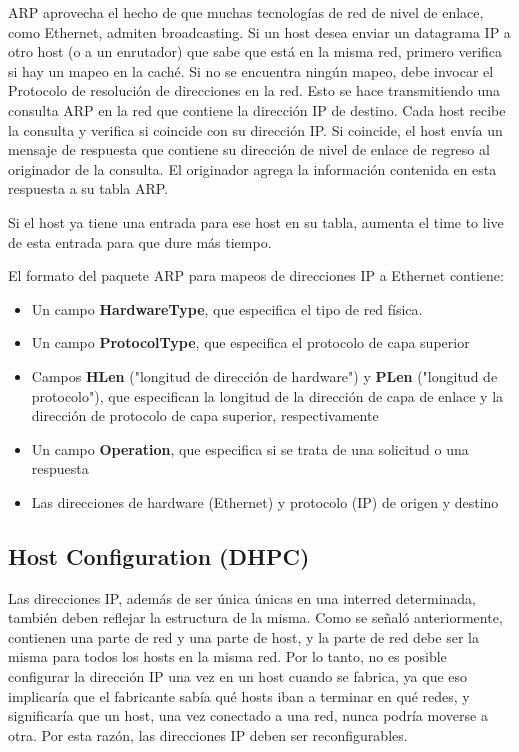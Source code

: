 ARP aprovecha el hecho de que muchas tecnologías de red de nivel de enlace, como Ethernet, admiten broadcasting. Si un host desea enviar un datagrama IP a otro host (o a un enrutador) que sabe que está en la misma red, primero verifica si hay un mapeo en la caché. Si no se encuentra ningún mapeo, debe invocar el Protocolo de resolución de direcciones en la red. Esto se hace transmitiendo una consulta ARP en la red que contiene la dirección IP de destino. Cada host recibe la consulta y verifica si coincide con su dirección IP. Si coincide, el host envía un mensaje de respuesta que contiene su dirección de nivel de enlace de regreso al originador de la consulta. El originador agrega la información contenida en esta respuesta a su tabla ARP.

Si el host ya tiene una entrada para ese host en su tabla, aumenta el time to live de esta entrada para que dure más tiempo.

El formato del paquete ARP para mapeos de direcciones IP a Ethernet contiene:
\begin{itemize}
    \item Un campo \textbf{HardwareType}, que especifica el tipo de red física.
    \item Un campo \textbf{ProtocolType}, que especifica el protocolo de capa superior
    \item Campos \textbf{HLen} ("longitud de dirección de hardware") y \textbf{PLen} ("longitud de protocolo"), que especifican la longitud de la dirección de capa de enlace y la dirección de protocolo de capa superior, respectivamente
    \item Un campo \textbf{Operation}, que especifica si se trata de una solicitud o una respuesta
    \item Las direcciones de hardware (Ethernet) y protocolo (IP) de origen y destino
\end{itemize}

\subsection{Host Configuration (DHPC)}
Las direcciones IP, además de ser única únicas en una interred determinada, también deben reflejar la estructura de la misma. Como se señaló anteriormente, contienen una parte de red y una parte de host, y la parte de red debe ser la misma para todos los hosts en la misma red. Por lo tanto, no es posible configurar la dirección IP una vez en un host cuando se fabrica, ya que eso implicaría que el fabricante sabía qué hosts iban a terminar en qué redes, y significaría que un host, una vez conectado a una red, nunca podría moverse a otra. Por esta razón, las direcciones IP deben ser reconfigurables.

